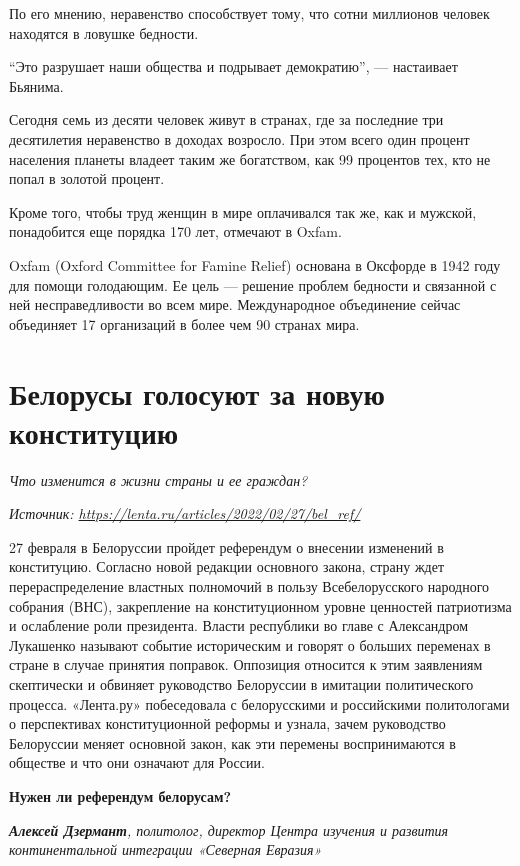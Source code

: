 По его мнению, неравенство способствует тому, что сотни миллионов человек находятся в ловушке бедности.

``Это разрушает наши общества и подрывает демократию'', --- настаивает Бьянима.

Сегодня семь из десяти человек живут в странах, где за последние три десятилетия неравенство в доходах возросло. При этом всего один процент населения планеты владеет таким же богатством, как 99 процентов тех, кто не попал в золотой процент.

Кроме того, чтобы труд женщин в мире оплачивался так же, как и мужской, понадобится еще порядка 170 лет, отмечают в Oxfam.

Oxfam (Oxford Committee for Famine Relief) основана в Оксфорде в 1942 году для помощи голодающим. Ее цель --- решение проблем бедности и связанной с ней несправедливости во всем мире. Международное объединение сейчас объединяет 17 организаций в более чем 90 странах мира.

\newpage
\section{Белорусы голосуют за новую конституцию}

\textit{Что изменится в жизни страны и ее граждан?}

\textit{Источник: \url{https://lenta.ru/articles/2022/02/27/bel_ref/}}

27 февраля в Белоруссии пройдет референдум о внесении изменений в конституцию. Согласно новой редакции основного закона, страну ждет перераспределение властных полномочий в пользу Всебелорусского народного собрания (ВНС), закрепление на конституционном уровне ценностей патриотизма и ослабление роли президента. Власти республики во главе с Александром Лукашенко называют событие историческим и говорят о больших переменах в стране в случае принятия поправок. Оппозиция относится к этим заявлениям скептически и обвиняет руководство Белоруссии в имитации политического процесса. «Лента.ру» побеседовала с белорусскими и российскими политологами о перспективах конституционной реформы и узнала, зачем руководство Белоруссии меняет основной закон, как эти перемены воспринимаются в обществе и что они означают для России.

\textbf{Нужен ли референдум белорусам?}

\textit{\textbf{Алексей Дзермант}, политолог, директор Центра изучения и развития континентальной интеграции «Северная Евразия»}

